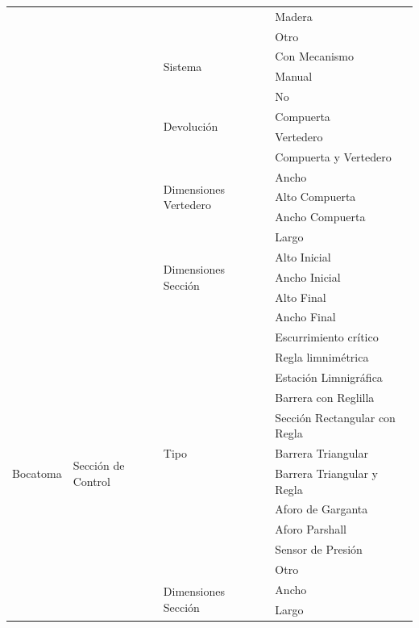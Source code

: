 \documentclass[]{article}
\begin{document}
\begin{longtable}{|p{3cm}|p{3.5cm}|p{3.5cm}|p{3.5cm}|}
    & & & Madera\\    \cline{4-4}
    & & & Otro\\    \cline{3-4}
    & & \multirow {2}{3.5cm}{Sistema} & Con Mecanismo\\    \cline{4-4}
    & & & Manual\\    \cline{3-4}
    & & \multirow {4}{3.5cm}{Devolución} & No\\    \cline{4-4}
    & & & Compuerta\\    \cline{4-4}
    & & & Vertedero\\    \cline{4-4}
    & & & Compuerta y Vertedero\\    \cline{3-4}
    & & \multirow {3}{3.5cm}{Dimensiones Vertedero} & Ancho\\    \cline{4-4}
    & & & Alto Compuerta\\    \cline{4-4}
    & & & Ancho Compuerta\\    \cline{3-4} \pagebreak
    & & \multirow {5}{3.5cm}{Dimensiones Sección} & Largo\\    \cline{4-4} 
    & & & Alto Inicial\\    \cline{4-4}
    & & & Ancho Inicial\\    \cline{4-4}
    & & & Alto Final\\    \cline{4-4}
    & & & Ancho Final\\    \cline{2-4} 
    \multirow {17}{3cm}{Bocatoma} & \multirow {17}{3.5cm}{Sección de Control} & \multirow {11}{3.5cm}{Tipo} &  Escurrimiento crítico\\    \cline{4-4}
    & & & Regla limnimétrica\\    \cline{4-4}
    & & & Estación Limnigráfica\\    \cline{4-4}
    & & & Barrera con Reglilla\\    \cline{4-4}
    & & & Sección Rectangular con Regla\\    \cline{4-4}
    & & & Barrera Triangular\\    \cline{4-4}
    & & & Barrera Triangular y Regla\\    \cline{4-4}
    & & & Aforo de Garganta\\    \cline{4-4}
    & & & Aforo Parshall\\    \cline{4-4}
    & & & Sensor de Presión\\    \cline{4-4}
    & & & Otro\\    \cline{3-4}
    & & \multirow {3}{3.5cm}{Dimensiones Sección} & Ancho\\    \cline{4-4}
    & & & Largo\\    \cline{4-4}

\end{longtable}
\end{document}
